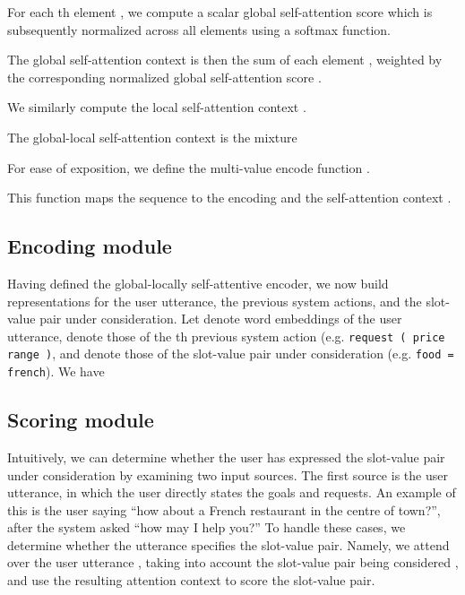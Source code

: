 \documentclass[11pt,a4paper]{article}
\begin{document}
For each th element , we compute a scalar global self-attention score  which is subsequently normalized across all elements using a softmax function.



The global self-attention context  is then the sum of each element , weighted by the corresponding normalized global self-attention score .



We similarly compute the local self-attention context .



The global-local self-attention context  is the mixture



For ease of exposition, we define the multi-value encode function .



This function maps the sequence  to the encoding  and the self-attention context .




\subsection{Encoding module}

Having defined the global-locally self-attentive encoder, we now build representations for the user utterance, the previous system actions, and the slot-value pair under consideration.
Let  denote word embeddings of the user utterance,  denote those of the th previous system action (e.g. \texttt{request ( price range )}, and  denote those of the slot-value pair under consideration (e.g. \texttt{food = french}).
We have




\subsection{Scoring module}

Intuitively, we can determine whether the user has expressed the slot-value pair under consideration by examining two input sources.
The first source is the user utterance, in which the user directly states the goals and requests.
An example of this is the user saying ``how about a French restaurant in the centre of town?'', after the system asked ``how may I help you?''
To handle these cases, we determine whether the utterance specifies the slot-value pair.
Namely, we attend over the user utterance , taking into account the slot-value pair being considered , and use the resulting attention context  to score the slot-value pair.
\end{document}
